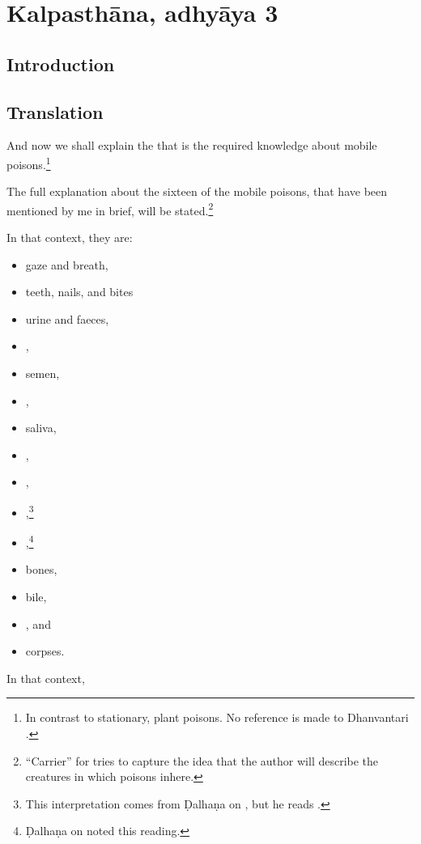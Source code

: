 \section{Kalpasthāna, adhyāya 3}

\subsection{Introduction}

\subsection{Translation}

\begin{translation}
    \item[1] And now we shall explain the  that is the required
knowledge about mobile poisons.\footnote{In contrast to stationary, plant
    poisons.  No reference is made to Dhanvantari
    \citep[see][]{birc-2021}.}


\item[3] 

The full explanation about the sixteen  of the mobile
poisons, that have been mentioned by me in brief, will be stated.\footnote{
    “Carrier” for  tries to capture the idea that the
    author will describe the creatures in which poisons inhere.}
 
 \item[4]
 In that context, they are: 
 \begin{multicols}{2}
 \begin{itemize}
     \item gaze and breath,
     \item teeth, nails, and bites
     \item  urine and faeces,
     \item {},
     \item semen,
     \item {},
     \item saliva,
     \item {},
     \item {},
     \item {},\footnote{This interpretation comes from
     Ḍalhaṇa on , but he reads .}
     \item {},\footnote{Ḍalhaṇa on  noted this reading.}
     \item bones,
     \item bile,
     \item {},
and 
     \item corpses.
     \end{itemize}
    \end{multicols}
\item[5] 
In that context,



\end{translation}
